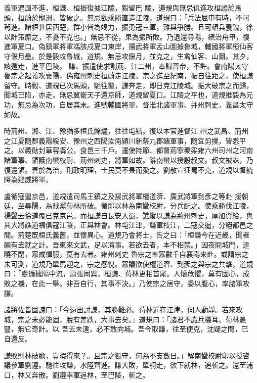 \begin{pinyinscope}
 義軍遇風不進，桓謙、桓振復據江陵，毅留巴
 陵，道規與無忌俱進攻桓謐於馬頭，桓蔚於寵洲，皆破之。無忌欲乘勝直造江陵，道規曰：「兵法屈申有時，不可茍進。諸桓世居西楚，群小皆為竭力，振勇冠三軍，難與爭勝。且可頓兵養銳，徐以計策縻之，不憂不克也。」無忌不從，果為振所敗。乃退還尋陽，繕治舟甲，復進軍夏口。偽鎮軍將軍馮該戍夏口東岸，揚武將軍孟山圖據魯城，輔國將軍桓仙客守偃月壘。於是毅攻魯城，道規、無忌攻偃月，並克之，生禽仙客、山圖。其夕，該遁走，進平巴陵。
 謙、振遣使求割荊、江二州，奉歸晉帝，不許。會南陽太守魯宗之起義攻襄陽，偽雍州刺史桓蔚走江陵。宗之進至紀南，振自往距之，使桓謙留守。時毅、道規已次馬頭，馳往襲，謙奔走，即日克江陵城。振大破宗之而歸，聞城已陷，亦走。無忌翼衛天子還京師，道規留夏口。江陵之平也，道規推毅為元功，無忌為次功，自居其末。進號輔國將軍、督淮北諸軍事、并州刺史，義昌太守如故。



 時荊州、湘、江、豫猶多桓氏餘燼，往往屯結。復以本官進督江
 州之武昌、荊州之江夏隨郡義陽綏安、豫州之西陽汝南潁川新蔡九郡諸軍事，隨宜剪撲，皆悉平之。以義勛封華容縣公，食邑三千戶。遷使持節、都督荊寧秦梁雍六州司州之河南諸軍事、領護南蠻校尉、荊州刺史，將軍如故。辭南蠻以授殷叔文。叔文被誅，乃復還領。善於為治，刑政明理，士民莫不畏而愛之。劉敬宣征蜀不克，道規以督統降為建威將軍。



 盧循寇逼京邑，道規遣司馬王鎮之及揚武將軍檀道濟、廣武將軍到彥之等赴
 援朝廷，至尋陽，為賊黨荀林所破。循即以林為南蠻校尉，分兵配之。使乘勝伐江陵，揚聲云徐道覆已克京邑。而桓謙自長安入蜀，譙縱以謙為荊州刺史，厚加資給，與其大將譙道福俱寇江陵，正與林會。林屯江津，謙軍枝江，二寇交逼，分絕都邑之間。荊楚既桓氏義舊，並懷異心。道規乃會將士，告之曰：「桓謙今在近畿，聞者頗有去就之計。吾東來文武，足以濟事。若欲去者，本不相禁。」因夜開城門，達曉不閉，眾咸憚服，莫有去者。雍州刺史
 魯宗之率眾數千自襄陽來赴。或謂宗之未可測，道規乃單馬迎之，宗之感悅。眾議欲使檀道濟、到彥之與宗之共擊，道規曰：「盧循擁隔中流，扇張同異，桓謙、荀林更相首尾。人懷危懼，莫有固心，成敗之機，在此一舉。非吾自行，其事不決。」乃使宗之居守，委以腹心，率諸軍攻謙。



 諸將佐皆固諫曰：「今遠出討謙，其勝難必。荀林近在江津，伺人動靜。若來攻城，宗之未必能固，脫有差跌，大事去矣。」道規曰：「諸君不識兵機耳。荀林愚豎，無它奇計。以
 吾去未遠，必不敢向城。吾今取謙，往至便克，沈疑之間，已自還反。



 謙敗則林破膽，豈暇得來？。且宗之獨守，何為不支數日。」解南蠻校尉印以授咨議參軍劉遵。馳往攻謙，水陸齊進。謙大敗，單舸走，欲下就林，追斬之。還至浦口，林又奔散。劉遵率軍追林，至巴陵，斬之。




\end{pinyinscope}
